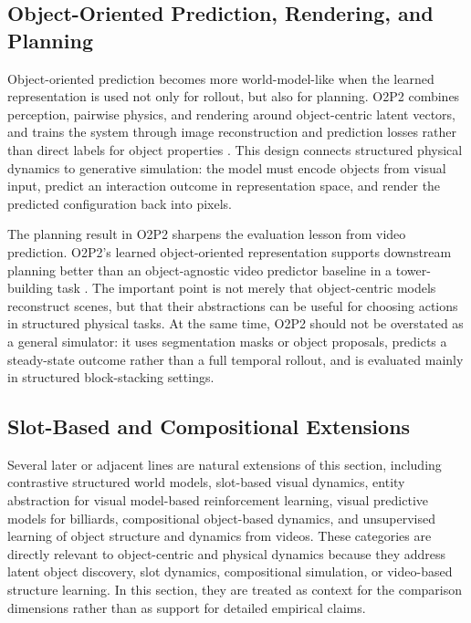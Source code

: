 \subsection{Object-Oriented Prediction, Rendering, and Planning}

Object-oriented prediction becomes more world-model-like when the learned representation is used not only for rollout, but also for planning. O2P2 combines perception, pairwise physics, and rendering around object-centric latent vectors, and trains the system through image reconstruction and prediction losses rather than direct labels for object properties \cite{janner2019_o2p2_prov}. This design connects structured physical dynamics to generative simulation: the model must encode objects from visual input, predict an interaction outcome in representation space, and render the predicted configuration back into pixels.

The planning result in O2P2 sharpens the evaluation lesson from video prediction. O2P2's learned object-oriented representation supports downstream planning better than an object-agnostic video predictor baseline in a tower-building task \cite{janner2019_o2p2_prov}. The important point is not merely that object-centric models reconstruct scenes, but that their abstractions can be useful for choosing actions in structured physical tasks. At the same time, O2P2 should not be overstated as a general simulator: it uses segmentation masks or object proposals, predicts a steady-state outcome rather than a full temporal rollout, and is evaluated mainly in structured block-stacking settings.

\subsection{Slot-Based and Compositional Extensions}

Several later or adjacent lines are natural extensions of this section, including contrastive structured world models, slot-based visual dynamics, entity abstraction for visual model-based reinforcement learning, visual predictive models for billiards, compositional object-based dynamics, and unsupervised learning of object structure and dynamics from videos. These categories are directly relevant to object-centric and physical dynamics because they address latent object discovery, slot dynamics, compositional simulation, or video-based structure learning. In this section, they are treated as context for the comparison dimensions rather than as support for detailed empirical claims.

